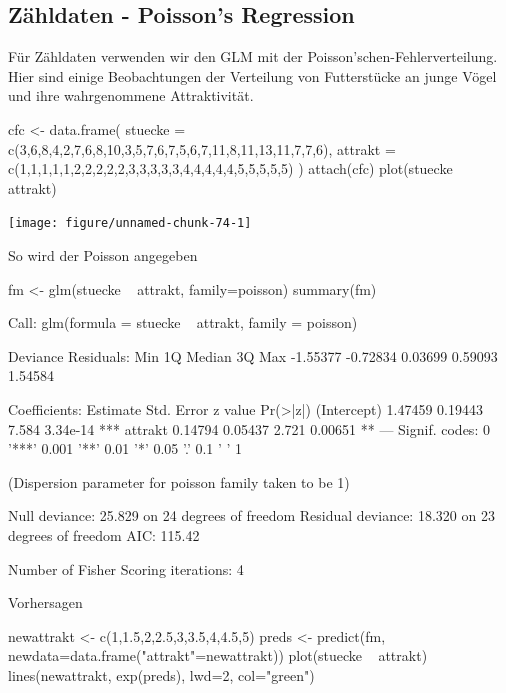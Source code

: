 \documentclass[a4paper,twoside]{tufte-book}\usepackage[]{graphicx}\usepackage[]{color}
\begin{document}
\begin{appendices}
\section{Zähldaten - Poisson's Regression}

Für Zähldaten verwenden wir den GLM mit der Poisson'schen-Fehlerverteilung. Hier sind einige Beobachtungen der Verteilung von Futterstücke an junge Vögel und ihre wahrgenommene Attraktivität.

\begin{Schunk}
\begin{Sinput}
cfc <- data.frame(
  stuecke = c(3,6,8,4,2,7,6,8,10,3,5,7,6,7,5,6,7,11,8,11,13,11,7,7,6),
  attrakt = c(1,1,1,1,1,2,2,2,2,2,3,3,3,3,3,4,4,4,4,4,5,5,5,5,5) 
)
attach(cfc)
plot(stuecke ~ attrakt)
\end{Sinput}

\texttt{[image: figure/unnamed-chunk-74-1]} \end{Schunk}


So wird der Poisson angegeben

\begin{Schunk}
\begin{Sinput}
fm <- glm(stuecke ~ attrakt, family=poisson)
summary(fm)
\end{Sinput}
\begin{Soutput}

Call:
glm(formula = stuecke ~ attrakt, family = poisson)

Deviance Residuals: 
     Min        1Q    Median        3Q       Max  
-1.55377  -0.72834   0.03699   0.59093   1.54584  

Coefficients:
            Estimate Std. Error z value Pr(>|z|)    
(Intercept)  1.47459    0.19443   7.584 3.34e-14 ***
attrakt      0.14794    0.05437   2.721  0.00651 ** 
---
Signif. codes:  0 '***' 0.001 '**' 0.01 '*' 0.05 '.' 0.1 ' ' 1

(Dispersion parameter for poisson family taken to be 1)

    Null deviance: 25.829  on 24  degrees of freedom
Residual deviance: 18.320  on 23  degrees of freedom
AIC: 115.42

Number of Fisher Scoring iterations: 4
\end{Soutput}
\end{Schunk}

Vorhersagen

\begin{Schunk}
\begin{Sinput}
newattrakt <- c(1,1.5,2,2.5,3,3.5,4,4.5,5)
preds <- predict(fm, newdata=data.frame("attrakt"=newattrakt))
plot(stuecke ~ attrakt)
lines(newattrakt, exp(preds), lwd=2, col="green")
\end{Sinput}


\end{Schunk}
\end{appendices}
\end{document}
